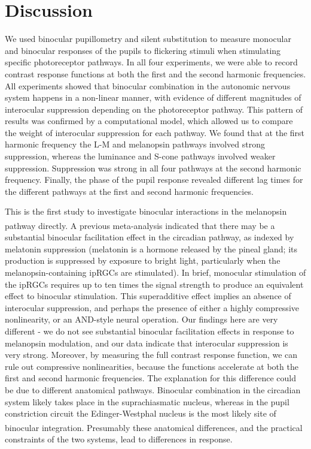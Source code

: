 \documentclass[
]{article}
\begin{document}
\section{Discussion}\label{discussion}

We used binocular pupillometry and silent substitution to measure monocular and binocular responses of the pupils to flickering stimuli when stimulating specific photoreceptor pathways. In all four experiments, we were able to record contrast response functions at both the first and the second harmonic frequencies. All experiments showed that binocular combination in the autonomic nervous system happens in a non-linear manner, with evidence of different magnitudes of interocular suppression depending on the photoreceptor pathway. This pattern of results was confirmed by a computational model, which allowed us to compare the weight of interocular suppression for each pathway. We found that at the first harmonic frequency the L-M and melanopsin pathways involved strong suppression, whereas the luminance and S-cone pathways involved weaker suppression. Suppression was strong in all four pathways at the second harmonic frequency. Finally, the phase of the pupil response revealed different lag times for the different pathways at the first and second harmonic frequencies.

This is the first study to investigate binocular interactions in the melanopsin pathway directly. A previous meta-analysis\textsuperscript{} indicated that there may be a substantial binocular facilitation effect in the circadian pathway, as indexed by melatonin suppression (melatonin is a hormone released by the pineal gland; its production is suppressed by exposure to bright light, particularly when the melanopsin-containing ipRGCs are stimulated). In brief, monocular stimulation of the ipRGCs requires up to ten times the signal strength to produce an equivalent effect to binocular stimulation. This superadditive effect implies an absence of interocular suppression, and perhaps the presence of either a highly compressive nonlinearity, or an AND-style neural operation. Our findings here are very different - we do not see substantial binocular facilitation effects in response to melanopsin modulation, and our data indicate that interocular suppression is very strong. Moreover, by measuring the full contrast response function, we can rule out compressive nonlinearities, because the functions accelerate at both the first and second harmonic frequencies. The explanation for this difference could be due to different anatomical pathways. Binocular combination in the circadian system likely takes place in the suprachiasmatic nucleus, whereas in the pupil constriction circuit the Edinger-Westphal nucleus is the most likely site of binocular integration\textsuperscript{}. Presumably these anatomical differences, and the practical constraints of the two systems, lead to differences in response.
\end{document}
